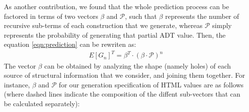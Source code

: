 %

As another contribution, we found that the whole prediction process can be
factored in terms of two vectors $\beta$ and $\mathcal{P}$, such that $\beta$
represents the number of recursive sub-terms of each construction that we
generate, whereas $\mathcal{P}$ simply represents the probability of generating
that partial ADT value.%
%
Then, the equation \ref{eqn:prediction} can be rewriten as:
%
\begin{align*}
  E[G_n]^T = \beta^T \cdot (\beta \cdot \mathcal{P})^{n}
\end{align*}
%
The vector $\beta$ can be obtained by analyzing the shape (namely holes) of each
source of structural information that we consider, and joining them together.
%
For instance, $\beta$ and $\mathcal{P}$ for our generation specification of HTML
values are as follows (where dashed lines indicate the composition of the
diffent sub-vectors that can be calculated separately):


